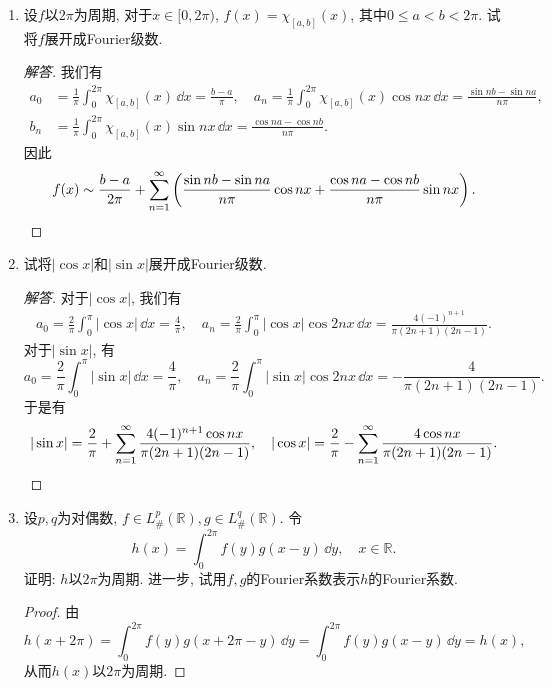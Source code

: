 \begin{quiza}
\begin{enumerate}
\item 设\(f\)以\(2\pi\)为周期, 对于\(x\in[0,2\pi)\), \(f(x)=\chi_{[a,b]}(x)\), 其中\(0\leqslant a<b<2\pi\). 试将\(f\)展开成Fourier级数.
\begin{proof}[解答]
我们有\[\begin{split}
a_0&=\frac{1}{\pi}\int_{0}^{2\pi}\chi_{[a,b]}(x)\,\dd x=\frac{b-a}{\pi},\quad a_n=\frac{1}{\pi}\int_{0}^{2\pi}\chi_{[a,b]}(x)\cos nx\,\dd x=\frac{\sin nb-\sin na}{n\pi},\\
b_n&=\frac{1}{\pi}\int_{0}^{2\pi}\chi_{[a,b]}(x)\sin nx\,\dd x=\frac{\cos na-\cos nb}{n\pi}.
\end{split}\]
因此\[f(x)\sim \frac{b-a}{2\pi}+\sum_{n=1}^{\infty}\left(\frac{\sin nb-\sin na}{n\pi}\cos nx+\frac{\cos na-\cos nb}{n\pi}\sin nx\right).\qedhere\]
\end{proof}
\item 试将\(\left|\cos x\right|\)和\(\left|\sin x\right|\)展开成Fourier级数.
\begin{proof}[解答]
	对于\(|\cos x|\), 我们有\[\begin{split}
a_0=\frac{2}{\pi}\int_{0}^{\pi}|\cos x|\,\dd x=\frac{4}{\pi},\quad a_n=\frac{2}{\pi}\int_{0}^{\pi}|\cos x|\cos 2nx\,\dd x=\frac{4(-1)^{n+1}}{\pi(2n+1)(2n-1)}.
\end{split}\]对于\(|\sin x|\), 有
\[a_0=\frac{2}{\pi}\int_{0}^{\pi}|\sin x|\,\dd x=\frac{4}{\pi},\quad 
a_n=\frac{2}{\pi}\int_{0}^{\pi}|\sin x|\cos 2nx\,\dd x=-\frac{4}{\pi(2n+1)(2n-1)}.\]
于是有\[|\sin x|=\frac{2}{\pi}+\sum_{n=1}^{\infty}\frac{4(-1)^{n+1}\cos nx}{\pi(2n+1)(2n-1)},\quad
|\cos x|=\frac{2}{\pi}-\sum_{n=1}^{\infty}\frac{4\cos nx}{\pi(2n+1)(2n-1)}.\qedhere\]
\end{proof}

\item 设\(p,q\)为对偶数, \(f\in L^p_{\#}(\mathbb{\mathbb{R}}), g\in L_{\#}^q(\mathbb{R})\). 令
\[h(x)=\int_{0}^{2\pi}f(y)g(x-y)\,\dd y,\quad x\in\mathbb{R}.\]
证明: \(h\)以\(2\pi\)为周期. 进一步, 试用\(f,g\)的Fourier系数表示\(h\)的Fourier系数.
\begin{proof}
由\[h(x+2\pi)=\int_{0}^{2\pi}f(y)g(x+2\pi-y)\,\dd y
=\int_{0}^{2\pi}f(y)g(x-y)\,\dd y=h(x),\]从而\(h(x)\)以\(2\pi\)为周期.


\end{proof}
\end{enumerate}
\end{quiza}
